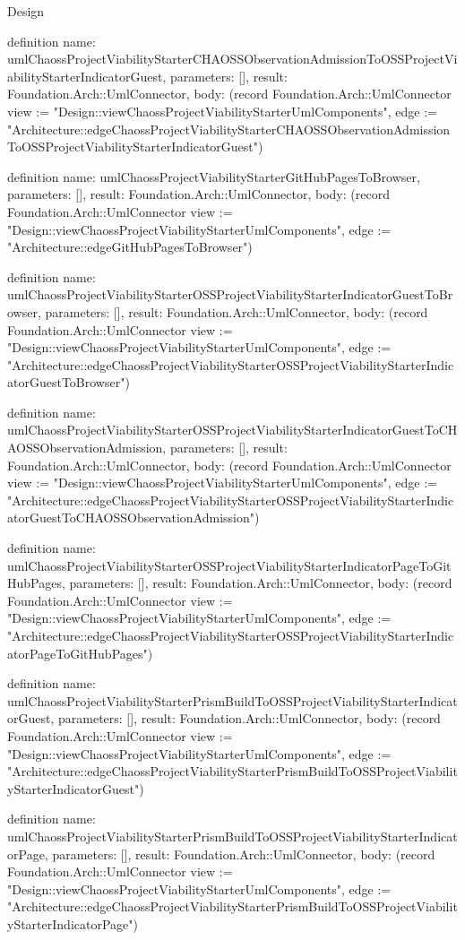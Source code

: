 \begin{lexlean}{Design}
\begin{semanticmodule}
definition{
  name: umlChaossProjectViabilityStarterCHAOSSObservationAdmissionToOSSProjectViabilityStarterIndicatorGuest,
  parameters: [],
  result: Foundation.Arch::UmlConnector,
  body: (record Foundation.Arch::UmlConnector {view := "Design::viewChaossProjectViabilityStarterUmlComponents", edge := "Architecture::edgeChaossProjectViabilityStarterCHAOSSObservationAdmissionToOSSProjectViabilityStarterIndicatorGuest"})
}

definition{
  name: umlChaossProjectViabilityStarterGitHubPagesToBrowser,
  parameters: [],
  result: Foundation.Arch::UmlConnector,
  body: (record Foundation.Arch::UmlConnector {view := "Design::viewChaossProjectViabilityStarterUmlComponents", edge := "Architecture::edgeGitHubPagesToBrowser"})
}

definition{
  name: umlChaossProjectViabilityStarterOSSProjectViabilityStarterIndicatorGuestToBrowser,
  parameters: [],
  result: Foundation.Arch::UmlConnector,
  body: (record Foundation.Arch::UmlConnector {view := "Design::viewChaossProjectViabilityStarterUmlComponents", edge := "Architecture::edgeChaossProjectViabilityStarterOSSProjectViabilityStarterIndicatorGuestToBrowser"})
}

definition{
  name: umlChaossProjectViabilityStarterOSSProjectViabilityStarterIndicatorGuestToCHAOSSObservationAdmission,
  parameters: [],
  result: Foundation.Arch::UmlConnector,
  body: (record Foundation.Arch::UmlConnector {view := "Design::viewChaossProjectViabilityStarterUmlComponents", edge := "Architecture::edgeChaossProjectViabilityStarterOSSProjectViabilityStarterIndicatorGuestToCHAOSSObservationAdmission"})
}

definition{
  name: umlChaossProjectViabilityStarterOSSProjectViabilityStarterIndicatorPageToGitHubPages,
  parameters: [],
  result: Foundation.Arch::UmlConnector,
  body: (record Foundation.Arch::UmlConnector {view := "Design::viewChaossProjectViabilityStarterUmlComponents", edge := "Architecture::edgeChaossProjectViabilityStarterOSSProjectViabilityStarterIndicatorPageToGitHubPages"})
}

definition{
  name: umlChaossProjectViabilityStarterPrismBuildToOSSProjectViabilityStarterIndicatorGuest,
  parameters: [],
  result: Foundation.Arch::UmlConnector,
  body: (record Foundation.Arch::UmlConnector {view := "Design::viewChaossProjectViabilityStarterUmlComponents", edge := "Architecture::edgeChaossProjectViabilityStarterPrismBuildToOSSProjectViabilityStarterIndicatorGuest"})
}

definition{
  name: umlChaossProjectViabilityStarterPrismBuildToOSSProjectViabilityStarterIndicatorPage,
  parameters: [],
  result: Foundation.Arch::UmlConnector,
  body: (record Foundation.Arch::UmlConnector {view := "Design::viewChaossProjectViabilityStarterUmlComponents", edge := "Architecture::edgeChaossProjectViabilityStarterPrismBuildToOSSProjectViabilityStarterIndicatorPage"})
}


\end{semanticmodule}
\end{lexlean}
